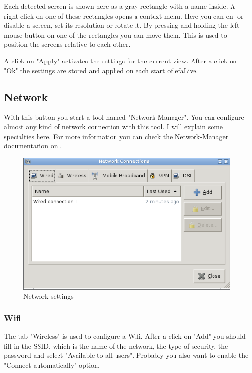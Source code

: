 \documentclass[a4paper,12pt,twoside]{article}
\begin{document}
Each detected screen is shown here as a gray rectangle with a name
inside. A right click on one of these rectangles opens a context menu.
Here you can en- or disable a screen, set its resolution or rotate it.
By pressing and holding the left mouse button on one of the rectangles
you can move them. This is used to position the screens relative to
each other.

A click on "Apply" activates the settings
for the current view. After a click on "Ok"
the settings are stored and applied on each start of efaLive.


\subsection{Network}
\label{sct:network}
With this button you start a tool named
"Network-Manager". You can configure almost
any kind of network connection with this tool. I will explain some
specialties here. For more information you can check the
Network-Manager documentation on \cite{NWM1}.

\begin{figure}
    \centering
    \includegraphics[width=12cm]{efaLiveen-img/efaLiveen-img24.png}
    \caption{Network settings}
    \label{fig:dialog_network}
\end{figure}


\subsubsection{Wifi}
\label{sct:wifi}
The tab "Wireless" is used to configure a
Wifi. After a click on "Add" you should
fill in the SSID, which is the name of the network, the type of
security, the password and select "Available to all
users". Probably you also want to enable the
"Connect automatically" option.
\end{document}
